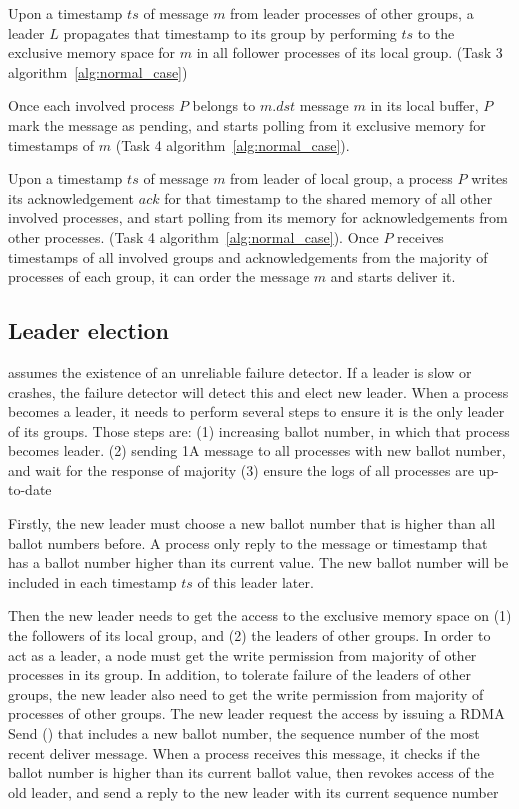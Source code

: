 Upon \lread a timestamp $ts$ of message $m$ from leader processes of other
groups, a leader $L$ propagates that timestamp to its group by performing
\rwrite $ts$ to the exclusive memory space for $m$ in all follower processes of
its local group. (Task 3 algorithm~\ref{alg:normal_case})

Once each involved process $P$ belongs to $m.dst$ \lread message $m$ in its
local buffer, $P$ mark the message as pending, and starts polling from it
exclusive memory for timestamps of $m$ (Task 4 algorithm~\ref{alg:normal_case}).

Upon \lread a timestamp $ts$ of message $m$ from leader of local group, a
process $P$ writes its acknowledgement $ack$ for that timestamp to the shared
memory of all other involved processes, and start polling from its memory for
acknowledgements from other processes. (Task 4 algorithm~\ref{alg:normal_case}).
Once $P$ receives timestamps of all involved groups and acknowledgements from
the majority of processes of each group, it can order the message $m$ and starts
deliver it.

\subsection{Leader election}

\libname assumes the existence of an unreliable failure detector. If a leader is
slow or crashes, the failure detector will detect this and elect new leader.
When a process becomes a leader, it needs to perform several steps to ensure it
is the only leader of its groups. Those steps are: (1) increasing ballot number,
in which that process becomes leader. (2) sending 1A message to all processes
with new ballot number, and wait for the response of majority (3) ensure the
logs of all processes are up-to-date

Firstly, the new leader must choose a new ballot number that is higher than all
ballot numbers before. A process only reply to the message or timestamp that has
a ballot number higher than its current value. The new ballot number will be
included in each timestamp $ts$ of this leader later.

Then the new leader needs to get the access to the exclusive memory space on (1)
the followers of its local group, and (2) the leaders of other groups. In order
to act as a leader, a node must get the write permission from majority of other
processes in its group. In addition, to tolerate failure of the leaders of other
groups, the new leader also need to get the write permission from majority of
processes of other groups. The new leader request the access by issuing a RDMA
Send () that includes a new ballot number, the
sequence number of the most recent deliver message. When a process receives this
message, it checks if the ballot number is higher than its current ballot value,
then revokes access of the old leader, and send a reply to the new leader with
its current sequence number

